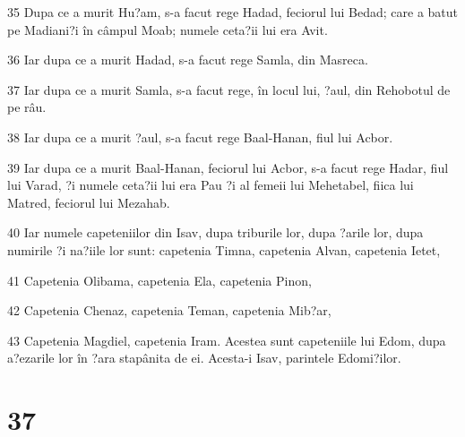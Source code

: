 \par 35 Dupa ce a murit Hu?am, s-a facut rege Hadad, feciorul lui Bedad; care a batut pe Madiani?i în câmpul Moab; numele ceta?ii lui era Avit.
\par 36 Iar dupa ce a murit Hadad, s-a facut rege Samla, din Masreca.
\par 37 Iar dupa ce a murit Samla, s-a facut rege, în locul lui, ?aul, din Rehobotul de pe râu.
\par 38 Iar dupa ce a murit ?aul, s-a facut rege Baal-Hanan, fiul lui Acbor.
\par 39 Iar dupa ce a murit Baal-Hanan, feciorul lui Acbor, s-a facut rege Hadar, fiul lui Varad, ?i numele ceta?ii lui era Pau ?i al femeii lui Mehetabel, fiica lui Matred, feciorul lui Mezahab.
\par 40 Iar numele capeteniilor din Isav, dupa triburile lor, dupa ?arile lor, dupa numirile ?i na?iile lor sunt: capetenia Timna, capetenia Alvan, capetenia Ietet,
\par 41 Capetenia Olibama, capetenia Ela, capetenia Pinon,
\par 42 Capetenia Chenaz, capetenia Teman, capetenia Mib?ar,
\par 43 Capetenia Magdiel, capetenia Iram. Acestea sunt capeteniile lui Edom, dupa a?ezarile lor în ?ara stapânita de ei. Acesta-i Isav, parintele Edomi?ilor.

\chapter{37}

